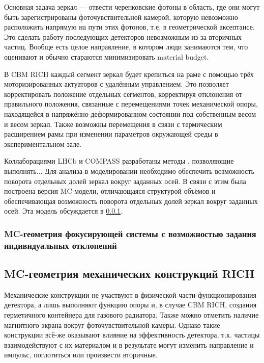 Основная задача зеркал --- отвести черенковские фотоны в область, где они могут быть зарегистрированы фоточувствительной камерой, которую невозможно расположить напрямую на пути этих фотонов, т.е. в геометрической аксептансе. Это сделать работу последующих детекторов невозможным из-за вторичных частиц. Вообще есть целое направление, в котором люди занимаются тем, что оценивают и обычно стараются минимизировать material budget.

В CBM RICH каждый сегмент зеркал будет крепиться на раме с помощью трёх \todo моторизированных актуаторов с удалённым управлением. Это позволяет корректировать положение отдельных сегментов, корректируя отклонения от правильного положения, связанные с перемещениями точек механической опоры, находящейся в напряжённо-деформированном состоянии под собственным весом и весом зеркал. Также возможны перемещения в связи с термическим расширением рамы при изменении параметров окружающей среды в экспериментальном зале.

Коллаборациями LHCb и COMPASS разработаны методы \todo, позволяющие выполнять...
Для анализа в моделировании необходимо обеспечить возможность поворота отдельных долей зеркал вокруг заданных осей. В связи с этим была построена версия MC-модели, отличающаяся структурой объёмов и обеспечивающая возможность поворота отдельных долей зеркал вокруг заданных осей. Эта модель обсуждается в \ref{sec:RICHgeoMirrorMis}.



\subsubsection{MC-геометрия фокусирующей системы с возможностью задания индивидуальных отклонений}\label{sec:RICHgeoMirrorMis}

\subsection{MC-геометрия механических конструкций RICH}\label{RICHgeoMech}

Механические конструкции не участвуют в физической части функционирования детектора, а лишь выполняют функцию опоры и, в случае CBM RICH, создания герметичного контейнера для газового радиатора. Также можно отметить наличие магнитного экрана вокруг фоточувствительной камеры. Однако такие конструкции всё-же оказывают влияние на эффективность детектора, т.к. частицы взаимодействуют с их материалом и в результате могут изменить направление и импульс, поглотиться или произвести вторичные.

